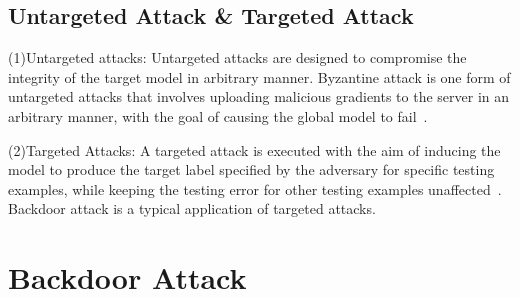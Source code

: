 \documentclass[a4paper,fleqn]{cas-dc}
\begin{document}
\subsection{Untargeted Attack \& Targeted Attack}
(1)Untargeted attacks: Untargeted attacks are designed
to compromise the integrity of the target model in
arbitrary manner. Byzantine attack is one form of untargeted
attacks that involves uploading malicious gradients to the
server in an arbitrary manner, with the goal of causing
the global model to fail~\cite{lamport2019byzantine,xie2020fall,bernstein2018signsgd,damaskinos2019aggregathor}.

(2)Targeted Attacks: A targeted attack is executed with
the aim of inducing the model to produce the target label
specified by the adversary for specific testing examples,
while keeping the testing error for other testing examples
unaffected~\cite{damaskinos2019aggregathor}. Backdoor attack is a typical application
of targeted attacks.


\section{Backdoor Attack}
\label{Backdoor Attack}
\end{document}
